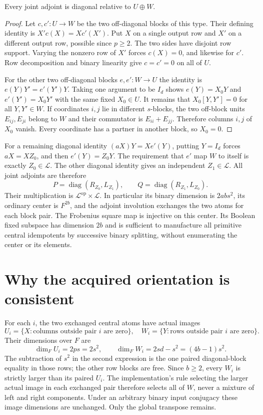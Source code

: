 \documentclass[11pt]{article}
\begin{document}
\begin{lemma}
Every joint adjoint is diagonal relative to $U\oplus W$.
\end{lemma}
\begin{proof}
Let $c,c':U\to W$ be the two off-diagonal blocks of this type. Their
defining identity is $X'c(X)=Xc'(X')$. Put $X$ on a single output row
and $X'$ on a different output row, possible since $p\ge2$. The two
sides have disjoint row support. Varying the nonzero row of $X'$ forces
$c(X)=0$, and likewise for $c'$. Row decomposition and binary linearity
give $c=c'=0$ on all of $U$.

For the other two off-diagonal blocks $e,e':W\to U$ the identity is
$e(Y)Y'=e'(Y')Y$. Taking one argument to be $I_d$ shows
$e(Y)=X_0Y$ and $e'(Y')=X_0Y'$ with the same fixed $X_0\in U$.
It remains that $X_0[Y,Y']=0$ for all $Y,Y'\in W$.
If coordinates $i,j$ lie in different $s$-blocks, the two off-block
units $E_{ij},E_{ji}$ belong to $W$ and their commutator is
$E_{ii}+E_{jj}$. Therefore columns $i,j$ of $X_0$ vanish. Every
coordinate has a partner in another block, so $X_0=0$.
\end{proof}

For a remaining diagonal identity $(aX)Y=Xe'(Y)$, putting $Y=I_d$
forces $aX=XZ_0$, and then $e'(Y)=Z_0Y$. The requirement that $e'$ map
$W$ to itself is exactly $Z_0\in\mathcal L$. The other diagonal
identity gives an independent $Z_1\in\mathcal L$. All joint adjoints
are therefore
\[
 P=\operatorname{diag}(R_{Z_0},L_{Z_1}),\qquad
 Q=\operatorname{diag}(R_{Z_1},L_{Z_0}).
\]
Their multiplication is $\mathcal L^{\mathrm{op}}\times\mathcal L$.
In particular its binary dimension is $2abs^2$, its ordinary center
is $F^{2b}$, and the adjoint involution exchanges the two atoms for
each block pair. The Frobenius square map is injective on this center.
Its Boolean fixed subspace has dimension $2b$ and is sufficient to
manufacture all primitive central idempotents by successive binary
splitting, without enumerating the center or its elements.

\section{Why the acquired orientation is consistent}

For each $i$, the two exchanged central atoms have actual images
\[
 U_i=\{X:\text{columns outside pair }i\text{ are zero}\},
 \quad
 W_i=\{Y:\text{rows outside pair }i\text{ are zero}\}.
\]
Their dimensions over $F$ are
\[
 \dim_F U_i=2ps=2s^2,\qquad
 \dim_F W_i=2sd-s^2=(4b-1)s^2.
\]
The subtraction of $s^2$ in the second expression is the one paired
diagonal-block equality in those rows; the other row blocks are free.
Since $b\ge2$, every $W_i$ is strictly larger than its paired $U_i$.
The implementation's rule selecting the larger actual image in each
exchanged pair therefore selects all of $W$, never a mixture of left
and right components. Under an arbitrary binary input conjugacy these
image dimensions are unchanged. Only the global transpose remains.
\end{document}
